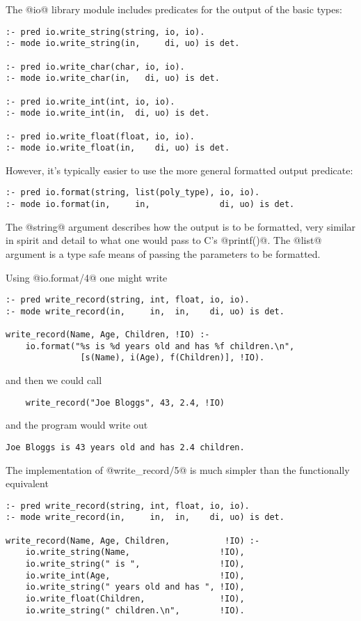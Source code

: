 The @io@ library module includes predicates for the output
of the basic types:
\begin{verbatim}
:- pred io.write_string(string, io, io).
:- mode io.write_string(in,     di, uo) is det.

:- pred io.write_char(char, io, io).
:- mode io.write_char(in,   di, uo) is det.

:- pred io.write_int(int, io, io).
:- mode io.write_int(in,  di, uo) is det.

:- pred io.write_float(float, io, io).
:- mode io.write_float(in,    di, uo) is det.
\end{verbatim}
However, it's typically easier to use the more general
formatted output predicate:
\begin{verbatim}
:- pred io.format(string, list(poly_type), io, io).
:- mode io.format(in,     in,              di, uo) is det.
\end{verbatim}
The @string@ argument describes how the output is to be formatted, very
similar in spirit and detail to what one would pass to C's @printf()@.
The @list@ argument is a type safe means of passing the parameters to be
formatted.

Using @io.format/4@ one might write
\begin{verbatim}
:- pred write_record(string, int, float, io, io).
:- mode write_record(in,     in,  in,    di, uo) is det.

write_record(Name, Age, Children, !IO) :-
    io.format("%s is %d years old and has %f children.\n",
               [s(Name), i(Age), f(Children)], !IO).
\end{verbatim}
and then we could call
\begin{verbatim}
    write_record("Joe Bloggs", 43, 2.4, !IO)
\end{verbatim}
and the program would write out
\begin{verbatim}
Joe Bloggs is 43 years old and has 2.4 children.
\end{verbatim}
The implementation of @write_record/5@ is much simpler than the
functionally equivalent
\begin{verbatim}
:- pred write_record(string, int, float, io, io).
:- mode write_record(in,     in,  in,    di, uo) is det.

write_record(Name, Age, Children,           !IO) :-
    io.write_string(Name,                  !IO),
    io.write_string(" is ",                !IO),
    io.write_int(Age,                      !IO),
    io.write_string(" years old and has ", !IO),
    io.write_float(Children,               !IO),
    io.write_string(" children.\n",        !IO).
\end{verbatim}


